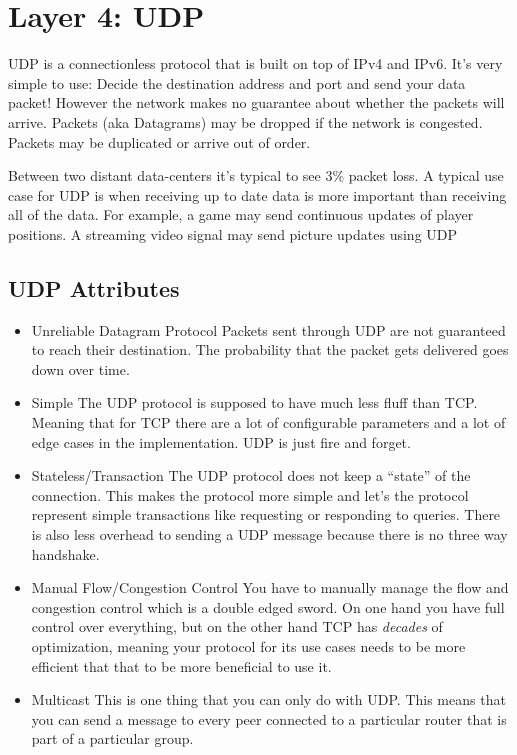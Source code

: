 \section{Layer 4: UDP}

UDP is a connectionless protocol that is built on top of IPv4 and IPv6.
It's very simple to use: Decide the destination address and port and send your data packet! However the network makes no guarantee about whether the packets will arrive.
Packets (aka Datagrams) may be dropped if the network is congested.
Packets may be duplicated or arrive out of order.

Between two distant data-centers it's typical to see 3\% packet loss. 
A typical use case for UDP is when receiving up to date data is more important than receiving all of the data.
For example, a game may send continuous updates of player positions.
A streaming video signal may send picture updates using UDP

\subsection{UDP Attributes}

\begin{itemize}
  \tightlist
\item Unreliable Datagram Protocol
  Packets sent through UDP are not guaranteed to reach their destination. The probability that the packet gets delivered goes down over time.
\item Simple
  The UDP protocol is supposed to have much less fluff than TCP.
  Meaning that for TCP there are a lot of configurable parameters and a lot of edge cases in the implementation.
  UDP is just fire and forget.
\item Stateless/Transaction
  The UDP protocol does not keep a ``state'' of the connection.
  This makes the protocol more simple and let's the protocol represent simple transactions like requesting or responding to queries.
  There is also less overhead to sending a UDP message because there is no three way handshake.
\item Manual Flow/Congestion Control
  You have to manually manage the flow and congestion control which is a double edged sword.
  On one hand you have full control over everything, but on the other hand TCP has \textit{decades} of optimization, meaning your protocol for its use cases needs to be more efficient that that to be more beneficial to use it.
\item Multicast
  This is one thing that you can only do with UDP.
  This means that you can send a message to every peer connected to a particular router that is part of a particular group.
\end{itemize}

